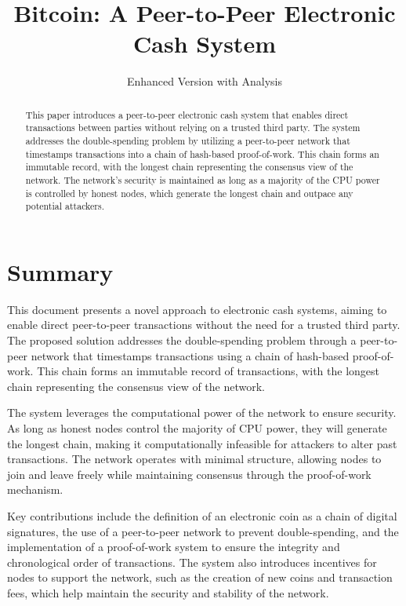 \documentclass{article}
\title{Bitcoin: A Peer-to-Peer Electronic Cash System}
\author{Enhanced Version with Analysis}
\date{}
\begin{document}
\maketitle

\section*{Summary}

This document presents a novel approach to electronic cash systems, aiming to enable direct peer-to-peer transactions without the need for a trusted third party. The proposed solution addresses the double-spending problem through a peer-to-peer network that timestamps transactions using a chain of hash-based proof-of-work. This chain forms an immutable record of transactions, with the longest chain representing the consensus view of the network.

The system leverages the computational power of the network to ensure security. As long as honest nodes control the majority of CPU power, they will generate the longest chain, making it computationally infeasible for attackers to alter past transactions. The network operates with minimal structure, allowing nodes to join and leave freely while maintaining consensus through the proof-of-work mechanism.

Key contributions include the definition of an electronic coin as a chain of digital signatures, the use of a peer-to-peer network to prevent double-spending, and the implementation of a proof-of-work system to ensure the integrity and chronological order of transactions. The system also introduces incentives for nodes to support the network, such as the creation of new coins and transaction fees, which help maintain the security and stability of the network.

\begin{abstract}
This paper introduces a peer-to-peer electronic cash system that enables direct transactions between parties without relying on a trusted third party. The system addresses the double-spending problem by utilizing a peer-to-peer network that timestamps transactions into a chain of hash-based proof-of-work. This chain forms an immutable record, with the longest chain representing the consensus view of the network. The network's security is maintained as long as a majority of the CPU power is controlled by honest nodes, which generate the longest chain and outpace any potential attackers.
\end{abstract}
\end{document}
